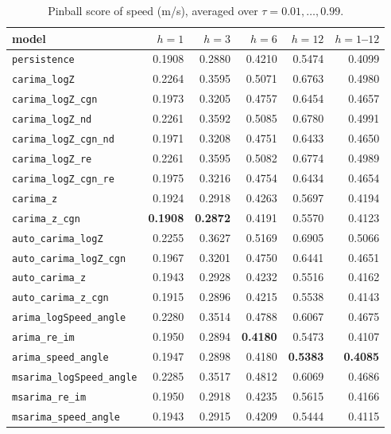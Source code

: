 \documentclass[11pt,a4paper]{article}
\newcommand{\1}{\mathbf{1}}
\begin{document}
\begin{table}[H]
  \centering
  \caption{Pinball score of speed (m/s), averaged over $\tau = 0.01, \dots, 0.99$.}\label{tab:pinball-speed}
  \begin{tabular}{lrrrrr}
    \toprule
    model & $h=1$ & $h=3$ & $h=6$ & $h=12$ & $h=1$--$12$ \\
    \midrule
\texttt{persistence} & 0.1908 & 0.2880 & 0.4210 & 0.5474 & 0.4099 \\ \midrule
\texttt{carima\_logZ} & 0.2264 & 0.3595 & 0.5071 & 0.6763 & 0.4980 \\
\texttt{carima\_logZ\_cgn} & 0.1973 & 0.3205 & 0.4757 & 0.6454 & 0.4657 \\
\texttt{carima\_logZ\_nd} & 0.2261 & 0.3592 & 0.5085 & 0.6780 & 0.4991 \\
\texttt{carima\_logZ\_cgn\_nd} & 0.1971 & 0.3208 & 0.4751 & 0.6433 & 0.4650 \\
\texttt{carima\_logZ\_re} & 0.2261 & 0.3595 & 0.5082 & 0.6774 & 0.4989 \\
\texttt{carima\_logZ\_cgn\_re} & 0.1975 & 0.3216 & 0.4754 & 0.6434 & 0.4654 \\
\texttt{carima\_z} & 0.1924 & 0.2918 & 0.4263 & 0.5697 & 0.4194 \\
\texttt{carima\_z\_cgn} & \textbf{0.1908} & \textbf{0.2872} & 0.4191 & 0.5570 & 0.4123 \\ \midrule
\texttt{auto\_carima\_logZ} & 0.2255 & 0.3627 & 0.5169 & 0.6905 & 0.5066 \\
\texttt{auto\_carima\_logZ\_cgn} & 0.1967 & 0.3201 & 0.4750 & 0.6441 & 0.4651 \\
\texttt{auto\_carima\_z} & 0.1943 & 0.2928 & 0.4232 & 0.5516 & 0.4162 \\
\texttt{auto\_carima\_z\_cgn} & 0.1915 & 0.2896 & 0.4215 & 0.5538 & 0.4143 \\ \midrule
\texttt{arima\_logSpeed\_angle} & 0.2280 & 0.3514 & 0.4788 & 0.6067 & 0.4675 \\
\texttt{arima\_re\_im} & 0.1950 & 0.2894 & \textbf{0.4180} & 0.5473 & 0.4107 \\
\texttt{arima\_speed\_angle} & 0.1947 & 0.2898 & 0.4180 & \textbf{0.5383} & \textbf{0.4085} \\
\texttt{msarima\_logSpeed\_angle} & 0.2285 & 0.3517 & 0.4812 & 0.6069 & 0.4686 \\
\texttt{msarima\_re\_im} & 0.1950 & 0.2918 & 0.4235 & 0.5615 & 0.4166 \\
\texttt{msarima\_speed\_angle} & 0.1943 & 0.2915 & 0.4209 & 0.5444 & 0.4115 \\
    \bottomrule
  \end{tabular}
\end{table}
\end{document}
